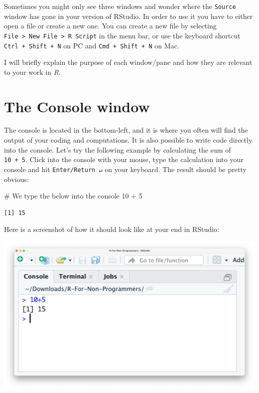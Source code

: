 \documentclass[
  letterpaper,
]{krantz}
\makeatletter
\newenvironment{Shaded}{\begin{snugshade}}{\end{snugshade}}
\newcommand{\CommentTok}[1]{\textcolor[rgb]{0.37,0.37,0.37}{#1}}
\newcommand{\DecValTok}[1]{\textcolor[rgb]{0.68,0.00,0.00}{#1}}
\newcommand{\SpecialCharTok}[1]{\textcolor[rgb]{0.37,0.37,0.37}{#1}}
\newenvironment{kframe}{%
\medskip{}
\setlength{\fboxsep}{.8em}
 \def\at@end@of@kframe{}%
 \ifinner\ifhmode%
  \def\at@end@of@kframe{\end{minipage}}%
  \begin{minipage}{\columnwidth}%
 \fi\fi%
 \def\FrameCommand##1{\hskip\@totalleftmargin \hskip-\fboxsep
 \colorbox{shadecolor}{##1}\hskip-\fboxsep
     \hskip-\linewidth \hskip-\@totalleftmargin \hskip\columnwidth}%
 \MakeFramed {\advance\hsize-\width
   \@totalleftmargin\z@ \linewidth\hsize
   \@setminipage}}%
 {\par\unskip\endMakeFramed%
 \at@end@of@kframe}
\renewenvironment{Shaded}{\begin{kframe}}{\end{kframe}}
\makeatother
\begin{document}
Sometimes you might only see three windows and wonder where the
\texttt{Source} window has gone in your version of RStudio. In order to
use it you have to either open a file or create a new one. You can
create a new file by selecting
\texttt{File\ \textgreater{}\ New\ File\ \textgreater{}\ R\ Script} in
the menu bar, or use the keyboard shortcut \texttt{Ctrl\ +\ Shift\ +\ N}
on PC and \texttt{Cmd\ +\ Shift\ +\ N} on Mac.

I will briefly explain the purpose of each window/pane and how they are
relevant to your work in \emph{R}.

\section{The Console window}\label{sec-the-console-window}

The console is located in the bottom-left, and it is where you often
will find the output of your coding and computations. It is also
possible to write code directly into the console. Let's try the
following example by calculating the sum of \texttt{10\ +\ 5}. Click
into the console with your mouse, type the calculation into your console
and hit \texttt{Enter/Return\ ↵} on your keyboard. The result should be
pretty obvious:

\begin{Shaded}
\begin{Highlighting}[]
\CommentTok{\# We type the below into the console}
\DecValTok{10} \SpecialCharTok{+} \DecValTok{5}
\end{Highlighting}
\end{Shaded}

\begin{verbatim}
[1] 15
\end{verbatim}

Here is a screenshot of how it should look like at your end in RStudio:

\includegraphics{images/chapter_04_img/02_console_window/console_algebra.png}
\end{document}
